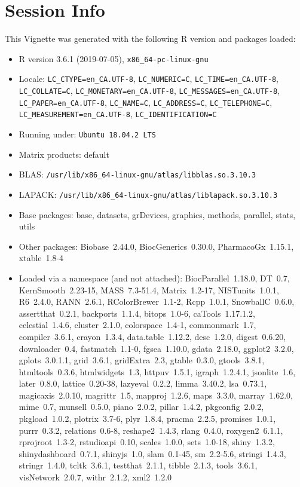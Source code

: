 \documentclass[11pt]{article}
\begin{document}
\section*{Session Info}

This Vignette was generated with the following R version and packages loaded:

\begin{itemize}\raggedright
  \item R version 3.6.1 (2019-07-05), \verb|x86_64-pc-linux-gnu|
  \item Locale: \verb|LC_CTYPE=en_CA.UTF-8|, \verb|LC_NUMERIC=C|, \verb|LC_TIME=en_CA.UTF-8|, \verb|LC_COLLATE=C|, \verb|LC_MONETARY=en_CA.UTF-8|, \verb|LC_MESSAGES=en_CA.UTF-8|, \verb|LC_PAPER=en_CA.UTF-8|, \verb|LC_NAME=C|, \verb|LC_ADDRESS=C|, \verb|LC_TELEPHONE=C|, \verb|LC_MEASUREMENT=en_CA.UTF-8|, \verb|LC_IDENTIFICATION=C|
  \item Running under: \verb|Ubuntu 18.04.2 LTS|
  \item Matrix products: default
  \item BLAS:   \verb|/usr/lib/x86_64-linux-gnu/atlas/libblas.so.3.10.3|
  \item LAPACK: \verb|/usr/lib/x86_64-linux-gnu/atlas/liblapack.so.3.10.3|
  \item Base packages: base, datasets, grDevices, graphics, methods,
    parallel, stats, utils
  \item Other packages: Biobase~2.44.0, BiocGenerics~0.30.0,
    PharmacoGx~1.15.1, xtable~1.8-4
  \item Loaded via a namespace (and not attached): BiocParallel~1.18.0,
    DT~0.7, KernSmooth~2.23-15, MASS~7.3-51.4, Matrix~1.2-17,
    NISTunits~1.0.1, R6~2.4.0, RANN~2.6.1, RColorBrewer~1.1-2,
    Rcpp~1.0.1, SnowballC~0.6.0, assertthat~0.2.1, backports~1.1.4,
    bitops~1.0-6, caTools~1.17.1.2, celestial~1.4.6, cluster~2.1.0,
    colorspace~1.4-1, commonmark~1.7, compiler~3.6.1, crayon~1.3.4,
    data.table~1.12.2, desc~1.2.0, digest~0.6.20, downloader~0.4,
    fastmatch~1.1-0, fgsea~1.10.0, gdata~2.18.0, ggplot2~3.2.0,
    gplots~3.0.1.1, grid~3.6.1, gridExtra~2.3, gtable~0.3.0,
    gtools~3.8.1, htmltools~0.3.6, htmlwidgets~1.3, httpuv~1.5.1,
    igraph~1.2.4.1, jsonlite~1.6, later~0.8.0, lattice~0.20-38,
    lazyeval~0.2.2, limma~3.40.2, lsa~0.73.1, magicaxis~2.0.10,
    magrittr~1.5, mapproj~1.2.6, maps~3.3.0, marray~1.62.0, mime~0.7,
    munsell~0.5.0, piano~2.0.2, pillar~1.4.2, pkgconfig~2.0.2,
    pkgload~1.0.2, plotrix~3.7-6, plyr~1.8.4, pracma~2.2.5,
    promises~1.0.1, purrr~0.3.2, relations~0.6-8, reshape2~1.4.3,
    rlang~0.4.0, roxygen2~6.1.1, rprojroot~1.3-2, rstudioapi~0.10,
    scales~1.0.0, sets~1.0-18, shiny~1.3.2, shinydashboard~0.7.1,
    shinyjs~1.0, slam~0.1-45, sm~2.2-5.6, stringi~1.4.3, stringr~1.4.0,
    tcltk~3.6.1, testthat~2.1.1, tibble~2.1.3, tools~3.6.1,
    visNetwork~2.0.7, withr~2.1.2, xml2~1.2.0
\end{itemize}


\end{document}
